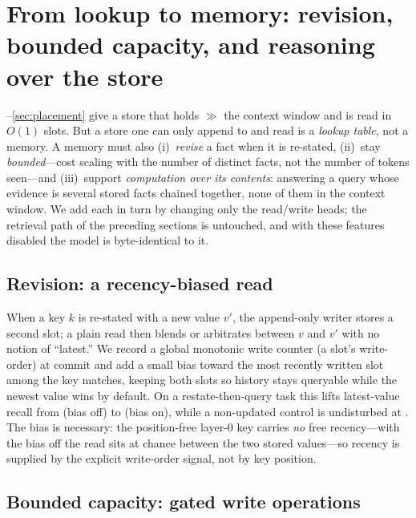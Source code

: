 \section{From lookup to memory: revision, bounded capacity, and reasoning over the store}
\label{sec:memory}

--\ref{sec:placement} give a store that holds $\gg$ the
context window and is read in $O(1)$ slots. But a store one can only append to and
read is a \emph{lookup table}, not a memory. A memory must also (i)~\emph{revise} a
fact when it is re-stated, (ii)~stay \emph{bounded}---cost scaling with the number of
distinct facts, not the number of tokens seen---and (iii)~support \emph{computation
over its contents}: answering a query whose evidence is several stored facts chained
together, none of them in the context window. We add each in turn by changing only
the read/write heads; the retrieval path of the preceding sections is untouched, and
with these features disabled the model is byte-identical to it.

\subsection{Revision: a recency-biased read}
\label{sec:memory:recency}

When a key $k$ is re-stated with a new value $v'$, the append-only writer stores a
second slot; a plain read then blends or arbitrates between $v$ and $v'$ with no
notion of ``latest.'' We record a global monotonic write counter (a slot's
write-order) at commit and add a small bias toward the most recently written slot
among the key matches, keeping both slots so history stays queryable while the newest
value wins by default. On a restate-then-query task this lifts latest-value recall
from  (bias off) to  (bias on), while a non-updated control
is undisturbed at . The bias is necessary: the position-free layer-0 key
carries \emph{no} free recency---with the bias off the read sits at chance between the
two stored values---so recency is supplied by the explicit write-order signal, not by
key position.

\subsection{Bounded capacity: gated write operations}
\label{sec:memory:gated}

